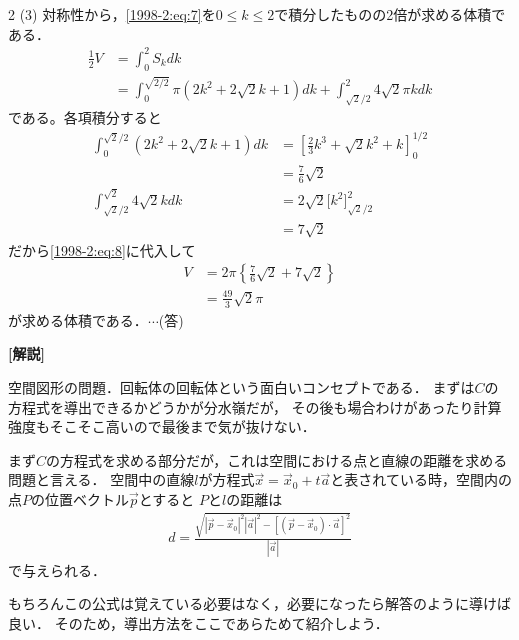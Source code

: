 \documentclass[../../main.tex]{subfiles}
\begin{document}
\begin{multicols}{2}
  \vspace{10pt}
  (3)
  対称性から，\cref{1998-2:eq:7}を$0\le k \le 2$で積分したものの2倍が求める体積である．
  \begin{align}
    \frac{1}{2}V
     & = \int_0^2 S_k dk                                                                                       \nonumber \\
     & = \int_0^{\sqrt{2/2}} \pi (2k^2+2\sqrt{2}k+1)dk + \int_{\sqrt{2}/2}^{2} 4\sqrt{2}\pi k dk \label{1998-2:eq:8}
  \end{align}
  である。各項積分すると
  \begin{align*}
    \int_0^{\sqrt{2}/2} (2k^2+2\sqrt{2}k+1)dk
     & = \left[ \frac{2}{3}k^3+\sqrt{2}k^2 + k \right]_0^{1/2} \\
     & = \frac{7}{6}\sqrt{2}                                   \\
    \int_{\sqrt{2}/2}^{\sqrt{2}} 4\sqrt{2}kdk
     & = 2\sqrt{2}\biggr [k^2\biggr ]_{\sqrt{2}/2}^{2}         \\
     & = 7\sqrt{2}
  \end{align*}
  だから\cref{1998-2:eq:8}に代入して
  \begin{align*}
    V
     & = 2\pi \left\{ \frac{7}{6}\sqrt{2} + 7\sqrt{2} \right\} \\
     & = \frac{49}{3}\sqrt{2}\pi
  \end{align*}
  が求める体積である．$\cdots$(答)

  \vspace{10pt}
  {\bf[解説]}

  空間図形の問題．回転体の回転体という面白いコンセプトである．
  まずは$C$の方程式を導出できるかどうかが分水嶺だが，
  その後も場合わけがあったり計算強度もそこそこ高いので最後まで気が抜けない．

  まず$C$の方程式を求める部分だが，これは空間における点と直線の距離を求める問題と言える．
  空間中の直線$l$が方程式$\vec{x}=\vec{x}_{0}+t\vec{a}$と表されている時，空間内の点$P$の位置ベクトル$\vec{p}$とすると
  $P$と$l$の距離は
  \begin{align*}
    d = \frac{\sqrt{|\vec{p}-\vec{x}_0|^2|\vec{a}|^2-\left[(\vec{p}-\vec{x}_{0})\cdot \vec{a}\right]^2}}{|\vec{a}|}
  \end{align*}
  で与えられる．

  もちろんこの公式は覚えている必要はなく，必要になったら解答のように導けば良い．
  そのため，導出方法をここであらためて紹介しよう．


\end{multicols}
\end{document}
